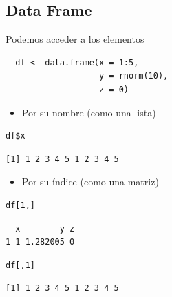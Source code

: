 \documentclass[aspectratio=169, usenames,svgnames,dvipsnames]{beamer}
\begin{document}
\subsection{Data Frame}
\label{sec:org8079d01}
\begin{frame}[label={sec:orge9cb4fc},fragile]{Podemos acceder a los elementos}
 \lstset{language=r,label= ,caption= ,captionpos=b,numbers=none}
\begin{lstlisting}
  df <- data.frame(x = 1:5,
                   y = rnorm(10),
                   z = 0)
\end{lstlisting}

\begin{itemize}
\item Por su nombre (como una lista)
\end{itemize}
\lstset{language=r,label= ,caption= ,captionpos=b,numbers=none}
\begin{lstlisting}
df$x
\end{lstlisting}

\begin{verbatim}
[1] 1 2 3 4 5 1 2 3 4 5
\end{verbatim}


\begin{itemize}
\item Por su índice (como una matriz)
\end{itemize}
\lstset{language=r,label= ,caption= ,captionpos=b,numbers=none}
\begin{lstlisting}
df[1,]
\end{lstlisting}

\begin{verbatim}
  x        y z
1 1 1.282005 0
\end{verbatim}


\lstset{language=r,label= ,caption= ,captionpos=b,numbers=none}
\begin{lstlisting}
df[,1]
\end{lstlisting}

\begin{verbatim}
[1] 1 2 3 4 5 1 2 3 4 5
\end{verbatim}
\end{frame}
\end{document}
